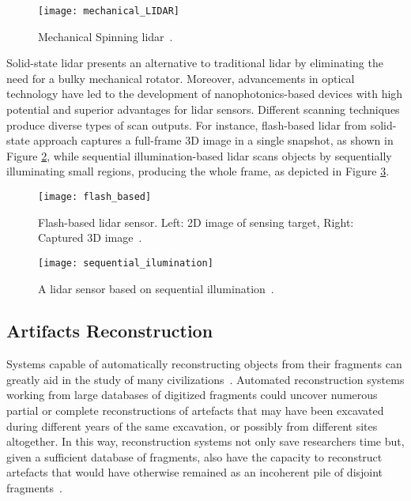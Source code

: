  
\begin{figure}[h!]
    \centering
    \texttt{[image: mechanical\_LIDAR]}
    \caption{Mechanical Spinning \gls{lidar}~\cite{inbook}.}
    \label{fig:mechanical_LIDAR}
\end{figure} 
\FloatBarrier


Solid-state \gls{lidar} presents an alternative to traditional \gls{lidar} by eliminating the need for a bulky mechanical rotator. %
Moreover, advancements in optical technology have led to the development of nanophotonics-based devices with high potential and superior advantages for \gls{lidar} sensors. %
Different scanning techniques produce diverse types of scan outputs. For instance, flash-based \gls{lidar} from solid-state approach captures a full-frame \gls{3D} image in a single snapshot, as shown in Figure \ref{fig:flash_based}, while sequential illumination-based \gls{lidar} scans objects by sequentially illuminating small regions, producing the whole frame, as depicted in Figure \ref{fig:sequential_ilumination}. \\

\begin{figure}[h!]
    \centering
    \texttt{[image: flash\_based]}
    \caption{Flash-based \gls{lidar} sensor. \small{Left: \gls{2D} image of sensing target, Right: Captured \gls{3D} image}~\cite{li2022progress}.}
    \label{fig:flash_based}
\end{figure} 

\begin{figure}[h!]
    \centering
    \texttt{[image: sequential\_ilumination]}
    \caption{A \gls{lidar} sensor based on sequential illumination~\cite{li2022progress}.}
    \label{fig:sequential_ilumination}
\end{figure} 

\FloatBarrier

\subsection{Artifacts Reconstruction}
\label{sec:reconstruction}

Systems capable of automatically reconstructing objects from their fragments can greatly aid in the study of many civilizations~\cite{willis2008computational}.
Automated reconstruction systems working from large databases of digitized fragments could uncover numerous partial or
complete reconstructions of artefacts that may have been excavated during different years of the same excavation, or possibly
from different sites altogether. In this way, reconstruction systems not only save researchers time but, given a sufficient database 
of fragments, also have the capacity to reconstruct artefacts that would have otherwise remained as an incoherent pile of disjoint fragments~.

